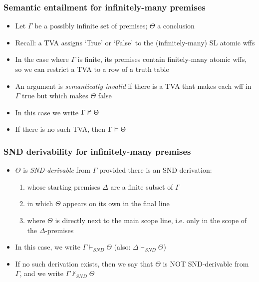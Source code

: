 \begin{frame}
\frametitle{Semantic entailment for infinitely-many premises}

\begin{itemize}[<+->]

\item Let $\Gamma$ be a possibly infinite set of premises; $\Theta$ a conclusion

\item Recall: a TVA assigns `True' or `False' to the (infinitely-many) SL atomic wffs

\item In the case where $\Gamma$ is finite, its premises contain finitely-many atomic wffs, so we can restrict a TVA to a row of a truth table

\item An argument is \emph{semantically invalid} if there is a TVA that makes each wff in $\Gamma$ true but which makes $\Theta$ false

\item In this case we write $\Gamma \nvDash \Theta$

\item If there is no such TVA, then $\Gamma \vDash \Theta$

\end{itemize}
\end{frame}

\begin{frame}
\frametitle{SND derivability for infinitely-many premises}

\begin{itemize}[<+->]

\item $\Theta$ is \emph{SND-derivable} from $\Gamma$ provided there is an SND derivation:

\begin{enumerate}[1.)]

\item whose starting premises $\Delta$ are a finite subset of $\Gamma$ 

\item in which $\Theta$ appears on its own in the final line

\item where $\Theta$ is directly next to the main scope line, i.e. only in the scope of the $\Delta$-premises

\end{enumerate}

\item In this case, we write $\Gamma \vdash_{SND} \Theta$ (also: $\Delta \vdash_{SND} \Theta$)

\item If no such derivation exists, then we say that $\Theta$ is NOT SND-derivable from $\Gamma$, and we write $\Gamma \nvdash_{SND} \Theta$

\end{itemize}
\end{frame}

